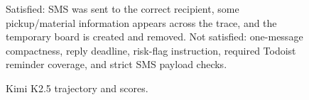 \begin{figure}[h]
{    \vspace{3pt}
    \hspace{3pt}

    \vspace{2pt}
    \noindent{}
    Satisfied: SMS was sent to the correct recipient, some pickup/material information appears across the trace, and the temporary board is created and removed.
    Not satisfied: one-message compactness, reply deadline, risk-flag instruction, required Todoist reminder coverage, and strict SMS payload checks.
    }
    \caption{Kimi K2.5 trajectory and scores.}
    \label{fig:case_leihaodi_1_kimi_trajectory}
\end{figure}
